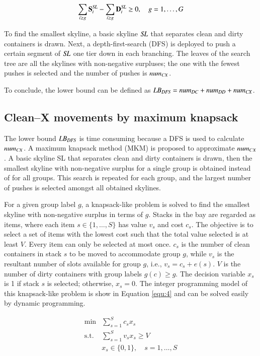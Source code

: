 \documentclass[review,3p,times,authoryear,12pt]{elsarticle}
\begin{document}
\begin{equation}
\label{equ:3}
\sum\limits_{i\ge g}\mathbf S^\id{SL}_i-\sum\limits_{i\ge g}\mathbf D^\id{SL}_i\ge0, \quad g=1,\dots,G
\end{equation}

To find the smallest skyline, a basic skyline $\id{SL}$ that separates clean and dirty containers is drawn. Next, a depth-first-search (DFS) is deployed to push a certain segment of $\id{SL}$ one tier down in each branching. The leaves of the search tree are all the skylines with non-negative surpluses; the one with the fewest pushes is selected and the number of pushes is $\id{num}_\id{CX}$.

To conclude, the lower bound can be defined as $\id{LB}_\id{DFS}=\id{num}_\id{DC}+\id{num}_\id{DD}+\id{num}_\id{CX}$.

\subsection{Clean--X movements by maximum knapsack}

The lower bound $\id{LB}_\id{DFS}$ is time consuming because a DFS is used to calculate $\id{num}_{\id{CX}}$. A maximum knapsack method (MKM) is proposed to approximate $\id{num}_{CX}$. A basic skyline SL that separates clean and dirty containers is drawn, then the smallest skyline with non-negative surplus for a single group is obtained instead of for all groups. This search is repeated for each group, and the largest number of pushes is selected amongst all obtained skylines.

For a given group label $g$, a knapsack-like problem is solved to find the smallest skyline with non-negative surplus in terms of $g$. Stacks in the bay are regarded as items, where each item $s\in\{1,\dots,S\}$ has value $v_s$ and cost $c_s$. The objective is to select a set of items with the lowest cost such that the total value selected is at least $V$. Every item can only be selected at most once. $c_s$ is the number of clean containers in stack $s$ to be moved to accommodate group $g$, while $v_s$ is the resultant number of slots available for group $g$, i.e., $v_s=c_s+e(s)$. $V$ is the number of dirty containers with group labels $g(c)\ge g$. The decision variable $x_s$ is 1 if stack $s$ is selected; otherwise, $x_s=0$. The integer programming model of this knapsack-like problem is show in Equation \ref{equ:4} and can be solved easily by dynamic programming.


\begin{equation}
\label{equ:4}
\begin{array}{rl}
\min & \sum\limits_{s=1}^S c_s x_s\\
\mathrm{s.t.} &\sum\limits_{s=1}^S v_s x_s\ge V\\
&x_s\in\{0,1\}, \quad s=1,\dots,S
\end{array}
\end{equation}
\end{document}
